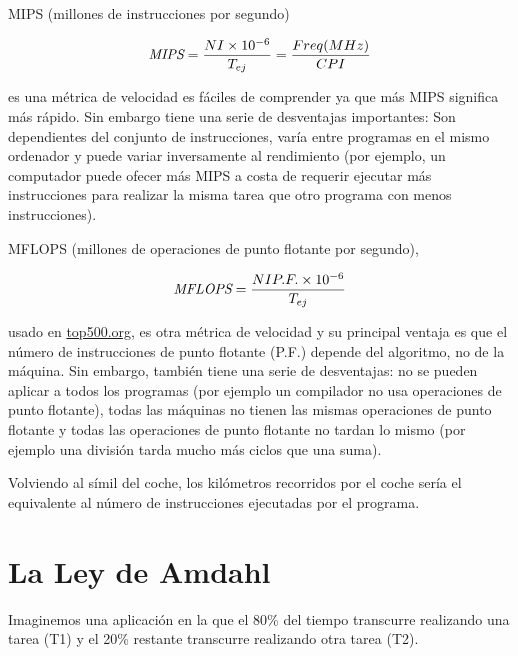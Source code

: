 \documentclass[12pt,onecolumn]{memoir}
\begin{document}
MIPS (millones de instrucciones por segundo)

\[ \emph{MIPS} = \frac{NI \times 10^{-6}}{T_{ej}} = \frac{Freq (MHz)}{CPI} \]

es una métrica de
velocidad es fáciles de comprender ya que más MIPS significa más
rápido. Sin embargo tiene una serie de desventajas importantes: Son
dependientes del conjunto de instrucciones, varía entre programas en
el mismo ordenador y puede variar inversamente al rendimiento (por
ejemplo, un computador puede ofecer más MIPS a costa de requerir ejecutar más
instrucciones para realizar la misma tarea que otro programa con menos
instrucciones).

MFLOPS (millones de operaciones de punto flotante por segundo),

\[ \emph{MFLOPS} = \frac{NI P.F. \times 10^{-6}}{T_{ej}} \]

usado
en \url{top500.org}, es otra métrica de velocidad y su principal
ventaja es que el número de instrucciones de punto flotante (P.F.)
depende del algoritmo, no de la máquina. Sin embargo, también tiene una serie
de desventajas: no se pueden aplicar a todos los programas (por
ejemplo un compilador no usa operaciones de punto flotante), todas las
máquinas no tienen las mismas operaciones de punto flotante y todas
las operaciones de punto flotante no tardan lo mismo (por ejemplo una
división tarda mucho más ciclos que una suma).

Volviendo al símil del coche, los kilómetros recorridos por el coche sería el
equivalente al número de instrucciones ejecutadas por el programa.

\section{La Ley de Amdahl}

Imaginemos una aplicación en la que el 80\% del tiempo transcurre
realizando una tarea (T1) y el 20\% restante transcurre realizando otra
tarea (T2).

\begin{center}
\end{center}
\end{document}
